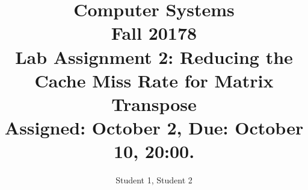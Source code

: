 \documentclass[11pt]{article}
\begin{document}
\title{Computer Systems\\
Fall 20178\\
Lab Assignment 2: Reducing the Cache Miss Rate for Matrix Transpose\\
Assigned: October 2, Due: October 10, 20:00. 
}

\author{Student 1, Student 2}
\date{}

\maketitle



\end{document}
